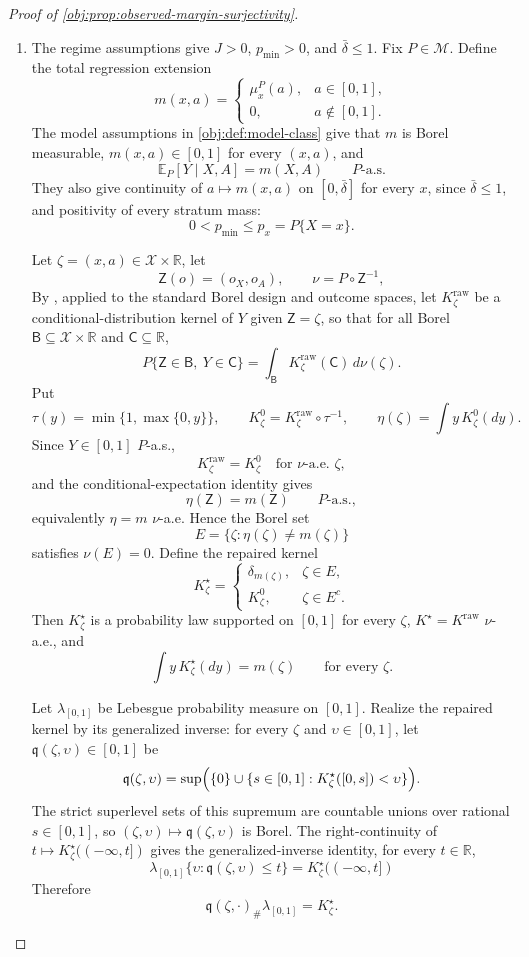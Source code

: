 \documentclass[11pt]{article}
\begin{document}
\begin{proof}[Proof of \cref{obj:prop:observed-margin-surjectivity}]
\begin{enumerate}
\item The regime assumptions give \(J>0\), \(p_{\min}>0\), and \(\bar\delta\le 1\).  Fix \(P\in\mathcal M\).  Define the total regression extension
\[
m(x,a)=
\begin{cases}
\mu_x^P(a), & a\in[0,1],\\
0, & a\notin[0,1].
\end{cases}
\]
The model assumptions in \cref{obj:def:model-class} give that \(m\) is Borel measurable, \(m(x,a)\in[0,1]\) for every \((x,a)\), and
\[
\mathbb E_P[Y\mid X,A]=m(X,A)\qquad P\text{-a.s.}
\]
They also give continuity of \(a\mapsto m(x,a)\) on \([0,\bar\delta]\) for every \(x\), since \(\bar\delta\le1\), and positivity of every stratum mass:
\[
0<p_{\min}\le p_x=P\{X=x\}.
\]

Let \(\zeta=(x,a)\in\mathcal X\times\mathbb R\), let
\[
\mathsf Z(o)=(o_X,o_A),
\qquad
\nu=P\circ\mathsf Z^{-1},
\]
By \citet[Theorem 6.3]{Kallenberg2002Foundations}, applied to the standard Borel design and outcome spaces, let \(K^{\mathrm{raw}}_\zeta\) be a conditional-distribution kernel of \(Y\) given \(\mathsf Z=\zeta\), so that for all Borel \(\mathsf B\subseteq\mathcal X\times\mathbb R\) and \(\mathsf C\subseteq\mathbb R\),
\[
P\{\mathsf Z\in\mathsf B,\ Y\in\mathsf C\}
=
\int_{\mathsf B}K^{\mathrm{raw}}_\zeta(\mathsf C)\,d\nu(\zeta).
\]
Put
\[
\tau(y)=\min\{1,\max\{0,y\}\},
\qquad
K^0_\zeta=K^{\mathrm{raw}}_\zeta\circ\tau^{-1},
\qquad
\eta(\zeta)=\int y\,K^0_\zeta(dy).
\]
Since \(Y\in[0,1]\) \(P\)-a.s.,
\[
K^{\mathrm{raw}}_\zeta=K^0_\zeta
\quad\text{for }\nu\text{-a.e. }\zeta,
\]
and the conditional-expectation identity gives
\[
\eta(\mathsf Z)=m(\mathsf Z)\qquad P\text{-a.s.},
\]
equivalently \(\eta=m\) \(\nu\)-a.e.  Hence the Borel set
\[
E=\{\zeta:\eta(\zeta)\ne m(\zeta)\}
\]
satisfies \(\nu(E)=0\).  Define the repaired kernel
\[
K^\star_\zeta=
\begin{cases}
\delta_{m(\zeta)}, & \zeta\in E,\\
K^0_\zeta, & \zeta\in E^c.
\end{cases}
\]
Then \(K^\star_\zeta\) is a probability law supported on \([0,1]\) for every \(\zeta\), \(K^\star=K^{\mathrm{raw}}\) \(\nu\)-a.e., and
\[
\int y\,K^\star_\zeta(dy)=m(\zeta)\qquad\text{for every }\zeta.
\]

Let \(\lambda_{[0,1]}\) be Lebesgue probability measure on \([0,1]\).  Realize the repaired kernel by its generalized inverse: for every \(\zeta\) and \(\upsilon\in[0,1]\), let \(\mathfrak q(\zeta,\upsilon)\in[0,1]\) be
\[
\mathfrak q(\zeta,\upsilon)
=
\sup\Bigl(\{0\}\cup
\{s\in[0,1]:K^\star_\zeta([0,s])<\upsilon\}\Bigr).
\]  The strict superlevel sets of this supremum are countable unions over rational \(s\in[0,1]\), so \((\zeta,\upsilon)\mapsto\mathfrak q(\zeta,\upsilon)\) is Borel.  The right-continuity of \(t\mapsto K^\star_\zeta((-\infty,t])\) gives the generalized-inverse identity, for every \(t\in\mathbb R\),
\[
\lambda_{[0,1]}\{\upsilon:\mathfrak q(\zeta,\upsilon)\le t\}
=
K^\star_\zeta((-\infty,t])
\]
Therefore
\[
\mathfrak q(\zeta,\cdot)_\#\lambda_{[0,1]}=K^\star_\zeta.
\]


\end{enumerate}
\end{proof}
\end{document}
